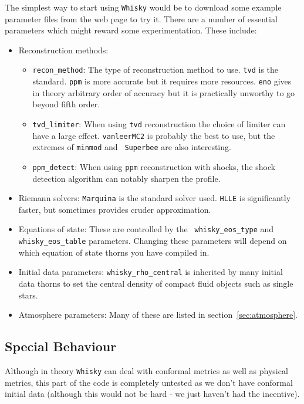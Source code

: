 \documentclass{article}
\begin{document}
The simplest way to start using {\tt Whisky} would be to download some
example parameter files from the web page to try it. There are a number
of essential parameters which might reward some experimentation. These
include:
\begin{itemize}
\item Reconstruction methods:
  \begin{itemize}
  \item {\tt recon\_method}: The type of reconstruction method to
    use. {\tt tvd} is the standard. {\tt ppm} is more accurate but it requires 
    more resources. {\tt eno} gives in theory
    arbitrary order of accuracy but it is practically unworthy to go beyond fifth order.
  \item {\tt tvd\_limiter}: When using {\tt tvd} reconstruction the
    choice of limiter can have a large effect. {\tt vanleerMC2} is
    probably the best to use, but the extremes of {\tt minmod} and {\tt
      Superbee} are also interesting.
  \item {\tt ppm\_detect}: When using {\tt ppm} reconstruction with
    shocks, the shock detection algorithm can notably sharpen the
    profile.
  \end{itemize}
\item Riemann solvers: {\tt Marquina} is the standard solver
  used. {\tt HLLE} is significantly faster, but sometimes provides cruder approximation.
\item Equations of state: These are controlled by the {\tt
    whisky\_eos\_type} and {\tt whisky\_eos\_table} parameters. Changing
  these parameters will depend on which equation of state thorns you
  have compiled in.
\item Initial data parameters: {\tt whisky\_rho\_central} is inherited by many
  initial data thorns to set the central density of compact fluid
  objects such as single stars.
\item Atmosphere parameters: Many of these are listed in
  section~\ref{sec:atmosphere}. 
\end{itemize}

\subsection{Special Behaviour}

Although in theory {\tt Whisky} can deal with conformal metrics as well as
physical metrics, this part of the code is completely untested as we
don't have conformal initial data (although this would not be hard -
we just haven't had the incentive).
\end{document}

